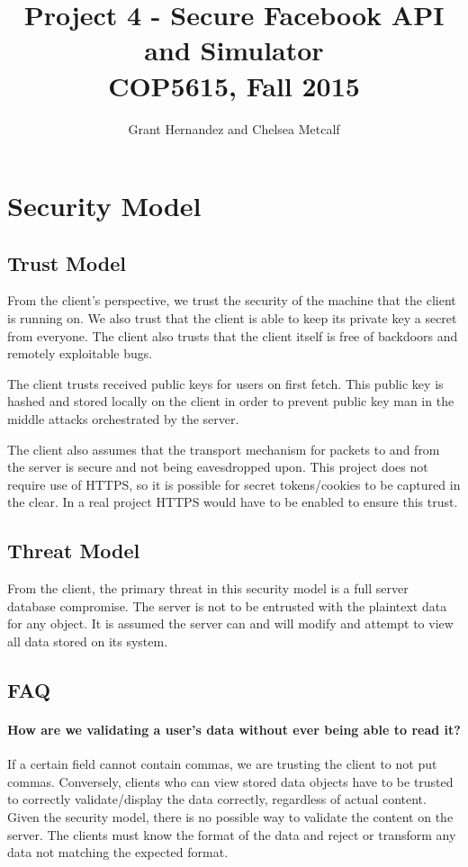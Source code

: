 \documentclass{article}
\begin{document}
\title{Project 4 - Secure Facebook API and Simulator \\ COP5615, Fall 2015}
 
\author{Grant Hernandez and Chelsea Metcalf}
 
\maketitle %

\section*{Security Model}

\subsection*{Trust Model}
From the client's perspective, we trust the security of the machine that the client is running on. We also trust that the client is able to keep its private key a secret from everyone. The client also trusts that the client itself is free of backdoors and remotely exploitable bugs.

The client trusts received public keys for users on first fetch. This public key is hashed and stored locally on the client in order to prevent public key man in the middle attacks orchestrated by the server.

The client also assumes that the transport mechanism for packets to and from the server is secure and not being eavesdropped upon. This project does not require use of HTTPS, so it is possible for secret tokens/cookies to be captured in the clear. In a real project HTTPS would have to be enabled to ensure this trust.

\subsection*{Threat Model}
From the client, the primary threat in this security model is a full server database compromise. The server is not to be entrusted with the plaintext data for any object. It is assumed the server can and will modify and attempt to view all data stored on its system.

\subsection*{FAQ}
\paragraph*{How are we validating a user's data without ever being able to read it?} If a certain field cannot contain commas, we are trusting the client to not put commas. Conversely, clients who can view stored data objects have to be trusted to correctly validate/display the data correctly, regardless of actual content. Given the security model, there is no possible way to validate the content on the server. The clients must know the format of the data and reject or transform any data not matching the expected format.
\end{document}
